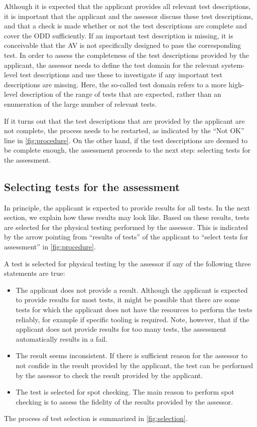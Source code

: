 Although it is expected that the applicant provides all relevant test descriptions, it is important that the applicant and the assessor discuss these test descriptions, and that a check is made whether or not the test descriptions are complete and cover the ODD sufficiently. If an important test description is missing, it is conceivable that the AV is not specifically designed to pass the corresponding test. In order to assess the completeness of the test descriptions provided by the applicant, the assessor needs to define the test domain for the relevant system-level test descriptions and use these to investigate if any important test descriptions are missing. Here, the so-called test domain refers to a more high-level description of the range of tests that are expected, rather than an enumeration of the large number of relevant tests.

If it turns out that the test descriptions that are provided by the applicant are not complete, the process needs to be restarted, as indicated by the ``Not OK'' line in \cref{fig:procedure}. On the other hand, if the test descriptions are deemed to be complete enough, the assessment proceeds to the next step: selecting tests for the assessment.



\subsection{Selecting tests for the assessment}
\label{sec:selection}

In principle, the applicant is expected to provide results for all tests. In the next section, we explain how these results may look like. Based on these results, tests are selected for the physical testing performed by the assessor. This is indicated by the arrow pointing from ``results of tests'' of the applicant to ``select tests for assessment'' in \cref{fig:procedure}.  

A test is selected for physical testing by the assessor if any of the following three statements are true:
\begin{itemize}
	\item The applicant does not provide a result. Although the applicant is expected to provide results for most tests, it might be possible that there are some tests for which the applicant does not have the resources to perform the tests reliably, for example if specific tooling is required. Note, however, that if the applicant does not provide results for too many tests, the assessment automatically results in a fail.
	\item The result seems inconsistent. If there is sufficient reason for the assessor to not confide in the result provided by the applicant, the test can be performed by the assessor to check the result provided by the applicant.
	\item The test is selected for spot checking. The main reason to perform spot checking is to assess the fidelity of the results provided by the assessor.
\end{itemize}
The process of test selection is summarized in \cref{fig:selection}.

